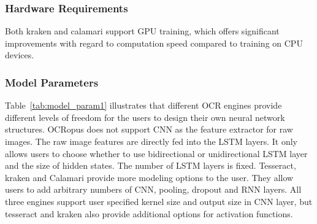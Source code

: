 \documentclass[conference]{IEEEtran}
\begin{document}

\subsubsection{Hardware Requirements}

Both kraken and calamari support GPU training, which offers significant
improvements with regard to computation speed compared to training on CPU devices.


\subsubsection{Model Parameters}

Table~\ref{tab:model_param1} illustrates that different OCR engines provide
different levels of freedom for the users to design their own neural network
structures. OCRopus does not support CNN as the feature extractor for raw
images. The raw image features are directly fed into the LSTM layers. It only
allows users to choose whether to use bidirectional or unidirectional LSTM
layer and the size of hidden states. The number of LSTM layers is fixed.
Tesseract, kraken and Calamari provide more modeling options to the user. They
allow users to add arbitrary numbers of CNN, pooling, dropout and RNN
layers. All three engines support user specified kernel size and output size in
CNN layer, but tesseract and kraken also provide additional options for
activation functions.

\end{document}
